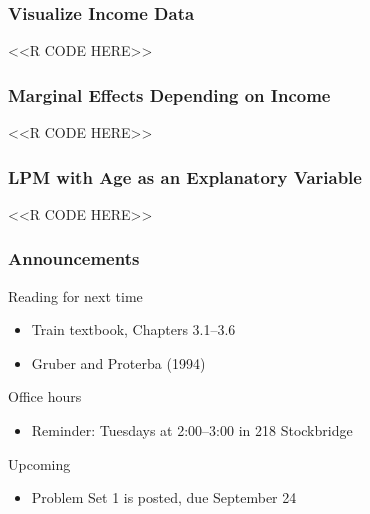 \documentclass{beamer}
\begin{document}
\begin{frame}[fragile]\frametitle{Visualize Income Data}
    <<R CODE HERE>>
\end{frame}

\begin{frame}[fragile]\frametitle{Marginal Effects Depending on Income}
    <<R CODE HERE>>
\end{frame}

\begin{frame}[fragile]\frametitle{LPM with Age as an Explanatory Variable}
    <<R CODE HERE>>
\end{frame}

\begin{frame}\frametitle{Announcements}
    Reading for next time
    \begin{itemize}
        \item Train textbook, Chapters 3.1--3.6
        \item Gruber and Proterba (1994)
    \end{itemize}
    \vspace{3ex}
    Office hours
    \begin{itemize}
        \item Reminder: Tuesdays at 2:00--3:00 in 218 Stockbridge
    \end{itemize}
    \vspace{3ex}
    Upcoming
    \begin{itemize}
        \item Problem Set 1 is posted, due September 24
    \end{itemize}
\end{frame}
\end{document}
